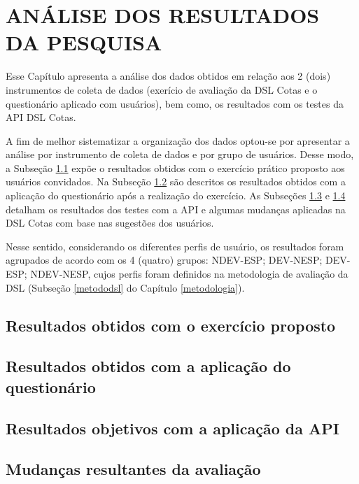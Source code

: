 \chapter{ANÁLISE DOS RESULTADOS DA  PESQUISA}
\label{chap:analise}

Esse Capítulo apresenta a análise dos dados obtidos em relação aos 2 (dois) instrumentos de coleta de dados (exerício de avaliação da DSL Cotas e o questionário aplicado com usuários), bem como, os resultados com os testes da API DSL Cotas.

A fim de melhor sistematizar a organização dos dados optou-se por apresentar a análise por instrumento de coleta de dados e por grupo de usuários. Desse modo, a Subseção \ref{sec:analiseexercicio} expõe o resultados obtidos com o exercício prático proposto aos usuários convidados. Na Subseção \ref{sec:questionarioexercicio} são descritos os resultados obtidos com a aplicação do questionário após a realização do exercício. As Subseções \ref{sec:avaliacaoapi} e \ref{sec:mudanasresultantes} detalham os resultados dos testes com a API e algumas mudanças aplicadas na DSL Cotas com base nas sugestões dos usuários.
\item
Nesse sentido, considerando os diferentes perfis de usuário, os resultados foram agrupados de acordo com os 4 (quatro) grupos:  NDEV-ESP; DEV-NESP; DEV-ESP; NDEV-NESP, cujos perfis foram definidos na metodologia de avaliação da DSL (Subseção \ref{metododsl} do Capítulo \ref{metodologia}).




\section{Resultados obtidos com o exercício proposto}
\label{sec:analiseexercicio}

\section{Resultados obtidos com a aplicação do questionário}
\label{sec:questionarioexercicio}

\section{Resultados objetivos com a aplicação da API}
\label{sec:avaliacaoapi}


\section{Mudanças resultantes da avaliação}
\label{sec:mudanasresultantes}